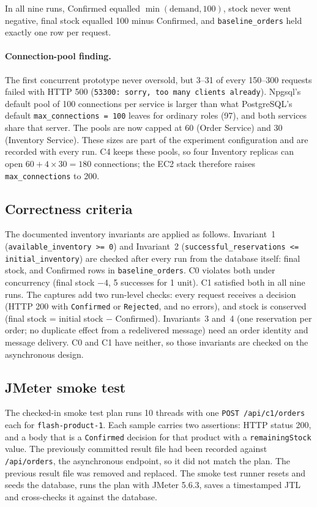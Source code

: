 \documentclass[a4paper]{report}
\begin{document}
In all nine runs, Confirmed equalled $\min(\text{demand}, 100)$, stock never
went negative, final stock equalled 100 minus Confirmed, and
\texttt{baseline\_orders} held exactly one row per request.

\paragraph{Connection-pool finding.} The first concurrent prototype never
oversold, but 3--31 of every 150--300 requests failed with HTTP 500
(\texttt{53300: sorry, too many clients already}). Npgsql's default pool of
100 connections per service is larger than what PostgreSQL's default
\texttt{max\_connections = 100} leaves for ordinary roles (97), and both
services share that server. The pools are now capped at 60 (Order Service)
and 30 (Inventory Service). These sizes are part of the experiment
configuration and are recorded with every run. C4 keeps these pools, so four
Inventory replicas can open $60 + 4 \times 30 = 180$ connections; the EC2
stack therefore raises \texttt{max\_connections} to 200.

\subsection{Correctness criteria}

The documented inventory invariants are applied as
follows. Invariant~1 (\texttt{available\_inventory >= 0}) and Invariant~2
(\texttt{successful\_reservations <= initial\_inventory}) are checked after
every run from the database itself: final stock, and Confirmed rows in
\texttt{baseline\_orders}. C0 violates both under concurrency (final stock
\(-4\), 5 successes for 1 unit). C1 satisfied both in all nine runs. The
captures add two run-level checks: every request receives a decision (HTTP 200
with \texttt{Confirmed} or \texttt{Rejected}, and no errors), and stock is
conserved (final stock = initial stock $-$ Confirmed). Invariants~3 and~4 (one
reservation per order; no duplicate effect from a redelivered message) need an
order identity and message delivery. C0 and C1 have neither, so those
invariants are checked on the asynchronous design.

\subsection{JMeter smoke test}

The checked-in smoke test plan runs 10 threads with
one \texttt{POST /api/c1/orders} each for \texttt{flash-product-1}. Each sample
carries two assertions: HTTP status 200, and a body that is a
\texttt{Confirmed} decision for that product with a \texttt{remainingStock}
value. The previously committed result file had been recorded against
\texttt{/api/orders}, the asynchronous endpoint, so it did not match the plan.
The previous result file was removed and replaced. The smoke test runner
resets and seeds the database, runs the plan with JMeter 5.6.3, saves a
timestamped JTL and cross-checks it against the database.
\end{document}
